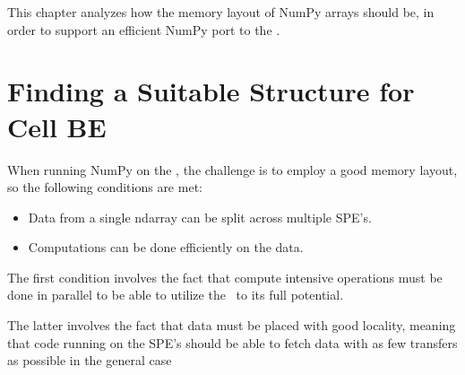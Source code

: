 %
%
This chapter analyzes how the memory layout of NumPy arrays should be,
in order to support an efficient NumPy port to the \CBE{}.



\section{Finding a Suitable Structure for Cell BE}

When running NumPy on the \CBE{}, the challenge is to employ a good
memory layout, so the following conditions are met:

\begin{itemize}
\item{Data from a single ndarray can be split across multiple SPE's.}
\item{Computations can be done efficiently on the data.}
\end{itemize}

The first condition involves the fact that compute intensive
operations must be done in parallel to be able to utilize the \CBE\
to its full potential.

The latter involves the fact that data must be placed with good
locality, meaning that code running on the SPE's should be able to
fetch data with as few transfers as possible in the general case

